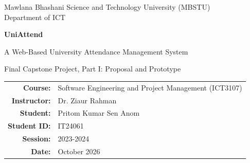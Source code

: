 \begin{titlepage}
\thispagestyle{empty}\centering
\vspace*{2cm}
{\large Mawlana Bhashani Science and Technology University (MBSTU)\\Department of ICT\par}
\vspace{1.8cm}
{\Huge\bfseries UniAttend\par}
\vspace{0.4cm}
{\Large A Web-Based University Attendance Management System\par}
\vspace{1cm}
{\large Final Capstone Project, Part I: Proposal and Prototype\par}
\vspace{1.8cm}
\begin{tabular}{rl}
\textbf{Course:} & Software Engineering and Project Management (ICT3107)\\
\textbf{Instructor:} & Dr. Ziaur Rahman\\
\textbf{Student:} & Pritom Kumar Sen Anom\\
\textbf{Student ID:} & IT24061\\
\textbf{Session:} & 2023-2024\\
\textbf{Date:} & October 2026
\end{tabular}
\end{titlepage}
\newpage
